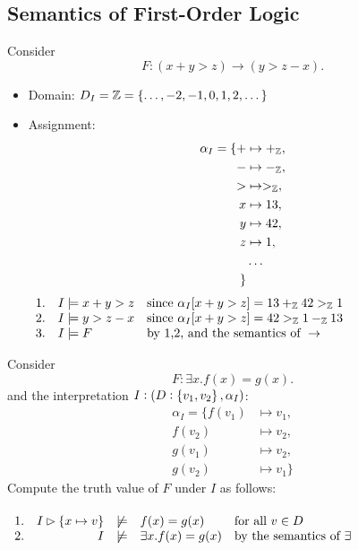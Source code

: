 \subsection{Semantics of First-Order Logic}
\begin{observation}
Consider \[
F:(x+y>z)\to (y>z-x).
\]
\begin{itemize}
	\item Domain: $D_I=\mathbb{Z}=\set{\dots,-2,-1,0,1,2,\dots}$
	\item Assignment: \begin{align*}
		\alpha_I = \{
		+ &\mapsto +_{\mathbb{Z}}, \\
		- &\mapsto -_{\mathbb{Z}}, \\
		> &\mapsto >_{\mathbb{Z}}, \\
		x &\mapsto 13, \\
		y &\mapsto 42, \\
		z &\mapsto 1, \\
		&\dots\\ \}
	\end{align*}
	\(\begin{array}{lll}
		1. & I\models x + y > z & \text{since}\ \alpha_I[x+y>z]=13+_\Z 42 >_\Z 1 \\
		2. & I\models y > z - x & \text{since}\ \alpha_I[x+y>z]=42 >_\Z 1 -_\Z 13 \\
		3. & I\models F & \text{by 1,2, and the semantics of}\ \to
	\end{array}\)
\end{itemize}
\end{observation}
\begin{observation}
Consider \[
F:\exists x.f(x)=g(x).
\] and the interpretation $I:(D:\set{v_1,v_2},\alpha_I)$: \begin{align*}
	\alpha_I = \{
	f(v_1) &\mapsto v_1, \\
	f(v_2) &\mapsto v_2, \\
	g(v_1) &\mapsto v_2, \\
	g(v_2) &\mapsto v_1 \}
\end{align*}
Compute the truth value of $F$ under $I$ as follows:\\ \\ \(\begin{array}{lrcll}
1. & I\rhd \set{x\mapsto v} &\not\models & f(x)=g(x) & \text{for all}\ v\in D \\
2. & I &\not\models & \exists x.f(x)=g(x) & \text{by the semantics of}\ \exists
\end{array}
\)
\end{observation}

